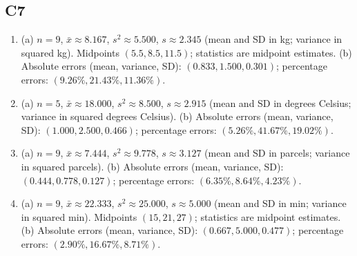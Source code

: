 {\subsection*{C7}
\begin{enumerate}[label=\textbf{C7.\arabic*.}]
\item (a) $n=9$, $\bar{x}\approx8.167$, $s^2\approx5.500$,
$s\approx2.345$ (mean and SD in kg; variance in squared kg).
Midpoints $(5.5,8.5,11.5)$; statistics are midpoint estimates.
(b) Absolute errors (mean, variance, SD): $(0.833,1.500,0.301)$; percentage errors: $(9.26\%,21.43\%,11.36\%)$.
\item (a) $n=5$, $\bar{x}\approx18.000$, $s^2\approx8.500$,
$s\approx2.915$ (mean and SD in degrees Celsius; variance in squared degrees Celsius).
(b) Absolute errors (mean, variance, SD): $(1.000,2.500,0.466)$; percentage errors: $(5.26\%,41.67\%,19.02\%)$.
\item (a) $n=9$, $\bar{x}\approx7.444$, $s^2\approx9.778$,
$s\approx3.127$ (mean and SD in parcels; variance in squared parcels).
(b) Absolute errors (mean, variance, SD): $(0.444,0.778,0.127)$; percentage errors: $(6.35\%,8.64\%,4.23\%)$.
\item (a) $n=9$, $\bar{x}\approx22.333$, $s^2\approx25.000$,
$s\approx5.000$ (mean and SD in min; variance in squared min).
Midpoints $(15,21,27)$; statistics are midpoint estimates.
(b) Absolute errors (mean, variance, SD): $(0.667,5.000,0.477)$; percentage errors: $(2.90\%,16.67\%,8.71\%)$.
\end{enumerate}
}


